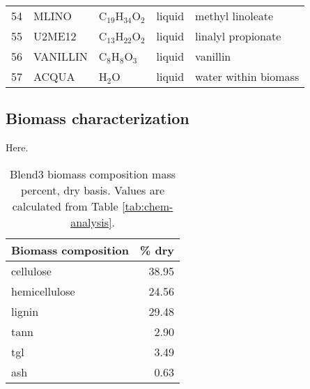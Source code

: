 \begin{center}
\begin{longtable}{lllll}
        54 & MLINO          & C$_{19}$H$_{34}$O$_2$   & liquid      & methyl linoleate \\
        55 & U2ME12         & C$_{13}$H$_{22}$O$_2$   & liquid      & linalyl propionate \\
        56 & VANILLIN       & C$_8$H$_8$O$_3$         & liquid      & vanillin \\
        57 & ACQUA          & H$_2$O                  & liquid      & water within biomass \\
        \bottomrule
    \end{longtable}
\end{center}

\subsection{Biomass characterization}

Here.

\begin{table}[H]
    \centering
    \caption{Blend3 biomass composition mass percent, dry basis. Values are calculated from Table \ref{tab:chem-analysis}.}
    \begin{tabular}{lr}
        \toprule
        Biomass composition & \% dry \\
        \midrule
        cellulose     & 38.95 \\
        hemicellulose & 24.56 \\
        lignin        & 29.48 \\
        tann          & 2.90  \\
        tgl           & 3.49  \\
        ash           & 0.63  \\
        \bottomrule
    \end{tabular}
\end{table}
